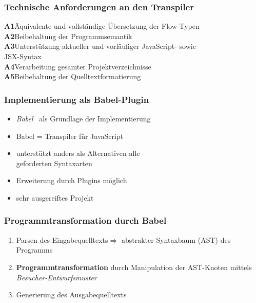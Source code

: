     \begin{frame}
      \frametitle{Technische Anforderungen an den Transpiler}
      \textbf{A1}\hspace{0.75em}Äquivalente und vollständige Übersetzung der Flow-Typen\\[.6em]
      \textbf{A2}\hspace{0.75em}Beibehaltung der Programmsemantik\\[.6em]
      \textbf{A3}\hspace{0.75em}Unterstützung aktueller und vorläufiger JavaScript- sowie\\\hspace{2.05em}JSX-Syntax\\[.6em]
      \textbf{A4}\hspace{0.75em}Verarbeitung gesamter Projektverzeichnisse\\[.6em]
      \textbf{A5}\hspace{0.75em}Beibehaltung der Quelltextformatierung
    \end{frame}

    \begin{frame}
      \frametitle{Implementierung als Babel-Plugin}
      \begin{itemize}
        \item \textit{Babel}~\autocite{BABEL} als Grundlage der Implementierung
        \item Babel = Transpiler für JavaScript
        \item unterstützt anders als Alternativen alle\\geforderten Syntaxarten
        \item Erweiterung durch Plugins möglich
        \item sehr ausgereiftes Projekt
      \end{itemize}
    \end{frame}

    \begin{frame}
      \frametitle{Programmtransformation durch Babel}
      \begin{enumerate}
        \item Parsen des Eingabequelltexts\linebreak$\Rightarrow$ abstrakter Syntaxbaum (AST) des Programms
        \item \textbf{Programmtransformation} durch Manipulation der AST-Knoten mittels \textit{Besucher-Entwurfsmuster}
        \item Generierung des Ausgabequelltexts
      \end{enumerate}
    \end{frame}

